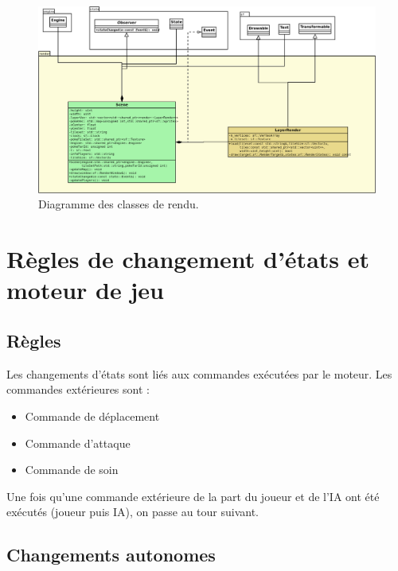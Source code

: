 \documentclass[a4paper,12pt]{article}
\begin{document}
    \begin{landscape}
    \begin{figure}[p]
    \includegraphics[width=0.9\paperheight]{render.png}
    \caption{\label{uml:render}Diagramme des classes de rendu.}
    \end{figure}
    \end{landscape}

    \clearpage
    \section{Règles de changement d'états et moteur de jeu}

    \subsection{Règles}
    
    Les changements d'états sont liés aux commandes exécutées par le moteur.
    Les commandes extérieures sont : 
    \begin{itemize}
        \item Commande de déplacement
        \item Commande d'attaque
        \item Commande de soin
    \end{itemize}
    
    Une fois qu'une commande extérieure de la part du joueur et de l'IA ont été exécutés (joueur puis IA), on passe au tour suivant.
    
    \subsection{Changements autonomes}
    
\end{document}
